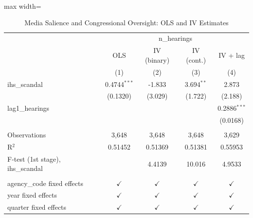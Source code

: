 \begin{table}[t]
\centering
\caption{Media Salience and Congressional Oversight: OLS and IV Estimates}
\label{tab:iv_results}
\footnotesize
\begingroup
\centering
\begin{adjustbox}{max width=\textwidth}
\begin{tabular}{lcccc}
   \toprule
    & \multicolumn{4}{c}{n\_hearings}\\
                                     & OLS            & IV (binary)   & IV (cont.)    & IV + lag \\   
                                     & (1)            & (2)           & (3)           & (4)\\  
   \midrule 
   ihs\_scandal                      & 0.4744$^{***}$ & -1.833        & 3.694$^{**}$  & 2.873\\   
                                     & (0.1320)       & (3.029)       & (1.722)       & (2.188)\\   
   lag1\_hearings                    &                &               &               & 0.2886$^{***}$\\   
                                     &                &               &               & (0.0168)\\   
    \\
   Observations                      & 3,648          & 3,648         & 3,648         & 3,629\\  
   R$^2$                             & 0.51452        & 0.51369       & 0.51381       & 0.55953\\  
   F-test (1st stage), ihs\_scandal  &                & 4.4139        & 10.016        & 4.9533\\  
    \\
   agency\_code fixed effects        & $\checkmark$   & $\checkmark$  & $\checkmark$  & $\checkmark$\\   
   year fixed effects                & $\checkmark$   & $\checkmark$  & $\checkmark$  & $\checkmark$\\   
   quarter fixed effects             & $\checkmark$   & $\checkmark$  & $\checkmark$  & $\checkmark$\\   
   \bottomrule
\end{tabular}
\end{adjustbox}
\par\endgroup
\par{}
\end{table}
